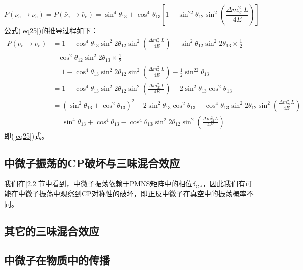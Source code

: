 \documentclass{article}
\begin{document}
		\begin{equation}
			P(\nu_e\to\nu_e)=P(\bar{\nu}_e\to\bar{\nu}_e)=\sin^4\theta_{13}+\cos^4\theta_{13}\left[1-\sin^22\theta_{12}\sin^2\left(\frac{\Delta m_{21}^2L}{4E}\right)\right]
			\label{eq25}
		\end{equation}
		公式(\ref{eq25})的推导过程如下：
		\begin{equation*}
			\begin{aligned}
				P(\nu_e\to\nu_e)&=1-\cos^{4}\theta_{13}\sin^{2}2\theta_{12}\sin^2\left(\frac{\Delta m_{21}^2L}{4E}\right)-\sin^{2}\theta_{12}\sin^{2}2\theta_{13}\times\frac{1}{2}\\
				&-\cos^{2}\theta_{12}\sin^{2}2\theta_{13}\times\frac{1}{2}\\
				&=1-\cos^{4}\theta_{13}\sin^{2}2\theta_{12}\sin^2\left(\frac{\Delta m_{21}^2L}{4E}\right)-\frac{1}{2}\sin^22\theta_{13}\\
				&=1-\cos^{4}\theta_{13}\sin^{2}2\theta_{12}\sin^2\left(\frac{\Delta m_{21}^2L}{4E}\right)-2\sin^2\theta_{13}\cos^2\theta_{13}\\
				&=(\sin^2\theta_{13}+\cos^2\theta_{13})^2-2\sin^2\theta_{13}\cos^2\theta_{13}-\cos^{4}\theta_{13}\sin^{2}2\theta_{12}\sin^2\left(\frac{\Delta m_{21}^2L}{4E}\right)\\
				&=\sin^4\theta_{13}+\cos^4\theta_{13}-\cos^{4}\theta_{13}\sin^{2}2\theta_{12}\sin^2\left(\frac{\Delta m_{21}^2L}{4E}\right)
			\end{aligned}
		\end{equation*}
		即(\ref{eq25})式。
	\subsection{中微子振荡的CP破坏与三味混合效应\label{2.3}}
	我们在\ref{2.2}节中看到，中微子振荡依赖于PMNS矩阵中的相位$\delta_\mathrm{CP}$，因此我们有可能在中微子振荡中观察到CP对称性的破坏，即正反中微子在真空中的振荡概率不同。
	
	
	
	
	
	
	
	
	
	
	
	
	
	
	
	
	
	
	
	
	
	\subsection{其它的三味混合效应}
	\subsection{中微子在物质中的传播\label{2.5}}
	\newpage
	\printbibliography
\end{document}

